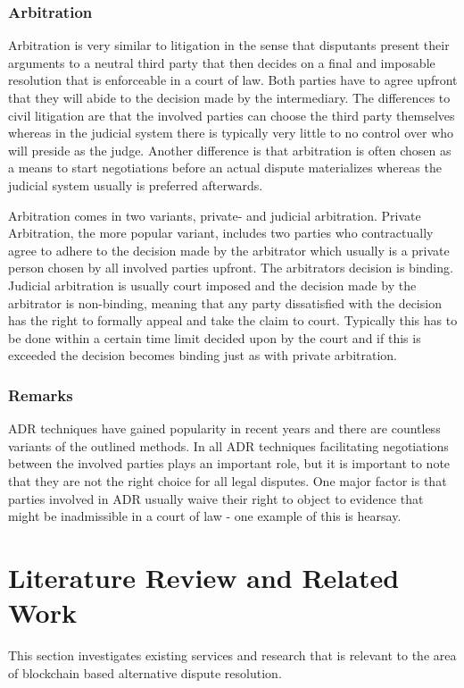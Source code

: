 \documentclass[12pt,msc,a4paper,oneside]{ucl_thesis}
\begin{document}
\subsubsection{Arbitration}
Arbitration is very similar to litigation in the sense that disputants present their arguments to a neutral third party that then decides on a final and imposable resolution that is enforceable in a court of law. Both parties have to agree upfront that they will abide to the decision made by the intermediary. 
The differences to civil litigation are that the involved parties can choose the third party themselves whereas in the judicial system there is typically very little to no control over who will preside as the judge. Another difference is that arbitration is often chosen as a means to start negotiations before an actual dispute materializes whereas the judicial system usually is preferred afterwards. \cite{adr_overview:findlaw}

Arbitration comes in two variants, private- and judicial arbitration. Private Arbitration, the more popular variant, includes two parties who contractually agree to adhere to the decision made by the arbitrator which usually is a private person chosen by all involved parties upfront. The arbitrators decision is binding. Judicial arbitration is usually court imposed and the decision made by the arbitrator is non-binding, meaning that any party dissatisfied with the decision has the right to formally appeal and take the claim to court. Typically this has to be done within a certain time limit decided upon by the court and if this is exceeded the decision becomes binding just as with private arbitration.

\subsubsection{Remarks}
ADR techniques have gained popularity in recent years and there are countless variants of the outlined methods. In all ADR techniques facilitating negotiations between the involved parties plays an important role, but it is important to note that they are not the right choice for all legal disputes. One major factor is that parties involved in ADR usually waive their right to object to evidence that might be inadmissible in a court of law - one example of this is hearsay.

\section{Literature Review and Related Work}
This section investigates existing services and research that is relevant to the area of blockchain based alternative dispute resolution. 
\end{document}
